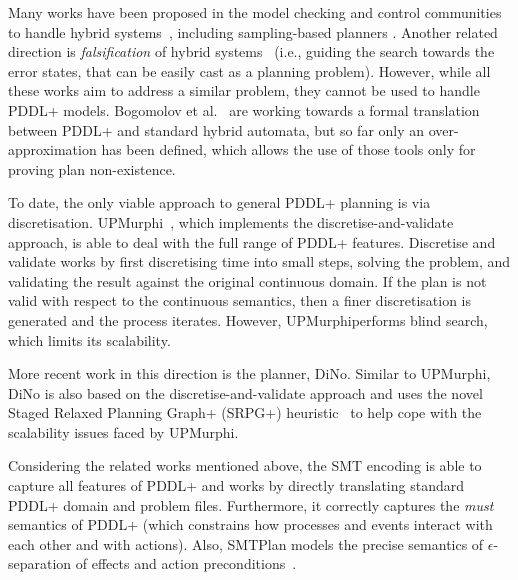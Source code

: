 Many works have been proposed in the model checking and control communities to handle hybrid systems~\cite{hycomp,nuxmv,smthybrid,pappas,maly}, including sampling-based planners \cite{rrt,sampl}. Another related direction is  \textit{falsification} of hybrid systems~\cite{falsif} (i.e., guiding the search towards the error states, that can be easily cast as a planning problem). However, while all these works aim to address a similar problem, they cannot be used to handle PDDL+ models. Bogomolov et al.~\cite{bogomolov14,bogomolov15} are working towards a formal translation between PDDL+ and standard hybrid automata, but so far only an over-approximation has been defined, which allows the use of those tools only for proving plan non-existence.

To date, the only viable approach to general PDDL+ planning is via discretisation. {\sc UPMurphi}~\cite{upmurphi}, which implements the discretise-and-validate approach, is able to deal with the full range of PDDL+ features. Discretise and validate works by first discretising time into small steps, solving the problem, and validating the result against the original continuous domain. If the plan is not valid with respect to the continuous semantics, then a finer discretisation is generated and the process iterates. However, {\sc UPMurphi}performs blind search, which limits its scalability.

More recent work in this direction is the planner, {\sc DiNo}. Similar to {\sc UPMurphi}, {\sc DiNo} is also based on the discretise-and-validate approach and uses the novel Staged Relaxed Planning Graph+ (SRPG+) heuristic~\cite{piotrowski2016heuristic} to help cope with the scalability issues faced by {\sc UPMurphi}.

Considering the related works mentioned above, the SMT encoding is able to capture all features of PDDL+ and works by directly translating standard PDDL+ domain and problem files. Furthermore, it correctly captures the \textit{must} semantics of PDDL+ (which constrains how processes and events interact with each other and with actions). Also, SMTPlan models the precise semantics of $\epsilon$-separation of effects and action preconditions~\cite{pddl+}.

